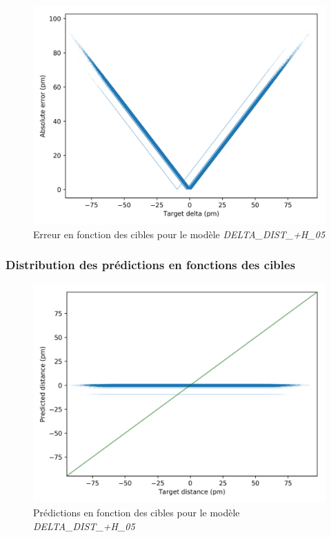 \begin{figure}[!h]
	\centering
	
	\includegraphics[scale=0.7]{../figures/DELTA_DIST_+H_05/DELTA_DIST+H_05_distrib_rmse_dist.png}	
	
	\caption{Erreur en fonction des cibles pour le modèle \emph{DELTA\_DIST\_+H\_05}}
	\end{figure}



\subsubsection{Distribution des prédictions en fonctions des cibles}

\begin{figure}[!h]
	\centering
	
	\includegraphics[scale=0.7]{../figures/DELTA_DIST_+H_05/DELTA_DIST+H_05_preds_targets.png}	
	
	\caption{Prédictions en fonction des cibles pour le modèle \emph{DELTA\_DIST\_+H\_05}}
	
\end{figure}

